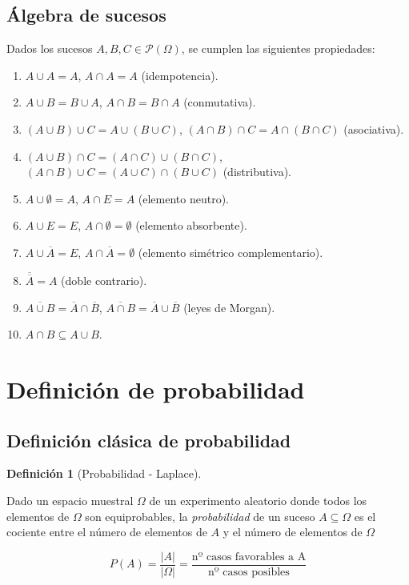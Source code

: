 \documentclass[
  spanish,
  a4paper,
]{scrreport}
\providecommand{\tightlist}{%
  \setlength{\itemsep}{0pt}\setlength{\parskip}{0pt}}
\theoremstyle{plain}
\theoremstyle{definition}
\theoremstyle{definition}
\newtheorem{definition}{Definición}[chapter]
\theoremstyle{remark}
\begin{document}
\subsection{Álgebra de sucesos}\label{uxe1lgebra-de-sucesos}

Dados los sucesos \(A,B,C\in  \mathcal{P}(\Omega)\), se cumplen las
siguientes propiedades:

\begin{enumerate}
\def\labelenumi{\arabic{enumi}.}
\tightlist
\item
  \(A\cup A=A\), \(A\cap A=A\) (idempotencia).
\item
  \(A\cup B=B\cup A\), \(A\cap B = B\cap A\) (conmutativa).
\item
  \((A\cup B)\cup C = A\cup (B\cup C)\),
  \((A\cap B)\cap C = A\cap (B\cap C)\) (asociativa).
\item
  \((A\cup B)\cap C = (A\cap C)\cup (B\cap C)\),
  \((A\cap B)\cup C = (A\cup C)\cap (B\cup C)\) (distributiva).
\item
  \(A\cup \emptyset=A\), \(A\cap E=A\) (elemento neutro).
\item
  \(A\cup E=E\), \(A\cap \emptyset=\emptyset\) (elemento absorbente).
\item
  \(A\cup \overline A = E\), \(A\cap \overline A= \emptyset\) (elemento
  simétrico complementario).
\item
  \(\overline{\overline A} = A\) (doble contrario).
\item
  \(\overline{A\cup B} = \overline A\cap \overline B\),
  \(\overline{A\cap B} = \overline A\cup \overline B\) (leyes de
  Morgan).
\item
  \(A\cap B\subseteq A\cup B\).
\end{enumerate}

\section{Definición de
probabilidad}\label{definiciuxf3n-de-probabilidad}

\subsection{Definición clásica de
probabilidad}\label{definiciuxf3n-cluxe1sica-de-probabilidad}

\begin{definition}[Probabilidad -
Laplace]\protect\hypertarget{def-laplace}{}\label{def-laplace}

Dado un espacio muestral \(\Omega\) de un experimento aleatorio donde
todos los elementos de \(\Omega\) son equiprobables, la
\emph{probabilidad} de un suceso \(A\subseteq \Omega\) es el cociente
entre el número de elementos de \(A\) y el número de elementos de
\(\Omega\)

\[P(A) = \frac{|A|}{|\Omega|} = \frac{\mbox{nº casos favorables a A}}{\mbox{nº casos posibles}}\]

\end{definition}
\end{document}
